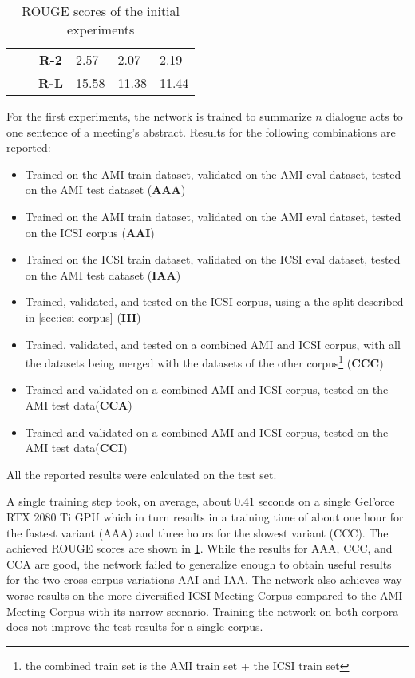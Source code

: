 \begin{table}[h]
\begin{tabular}{c|l|clll}
                              &                                                                                            & \textbf{R-2}    & 2.57         & 2.07         & 2.19       \\
                              &                                                                                            & \textbf{R-L}    & 15.58         & 11.38         & 11.44       \\ \hline
\end{tabular}
\caption{ROUGE scores of the initial experiments}
\label{tab:initial-experiment-rouge}
\end{table}

For the first experiments, the network is trained to summarize $n$ dialogue acts to one sentence of a meeting's abstract.
Results for the following combinations are reported:

\begin{itemize}
\item Trained on the AMI train dataset, validated on the AMI eval dataset, tested on the AMI test dataset (\textbf{AAA})
\item Trained on the AMI train dataset, validated on the AMI eval dataset, tested on the ICSI corpus (\textbf{AAI})
\item Trained on the ICSI train dataset, validated on the ICSI eval dataset, tested on the AMI test dataset (\textbf{IAA})
\item Trained, validated, and tested on the ICSI corpus, using a the split described in \cref{sec:icsi-corpus} (\textbf{III})
\item Trained, validated, and tested on a combined AMI and ICSI corpus, with all the datasets being merged with the datasets of the other corpus\footnote{\Eg the combined train set is the AMI train set + the ICSI train set} (\textbf{CCC})
\item Trained and validated on a combined AMI and ICSI corpus, tested on the AMI test data(\textbf{CCA})
\item Trained and validated on a combined AMI and ICSI corpus, tested on the AMI test data(\textbf{CCI})
\end{itemize}

All the reported results were calculated on the test set.

A single training step took, on average, about $0.41$ seconds on a single GeForce RTX 2080 Ti GPU which in turn results in a training time of about one hour for the fastest variant (AAA) and three hours for the slowest variant (CCC).
The achieved ROUGE scores are shown in \cref{tab:initial-experiment-rouge}.
While the results for AAA, CCC, and CCA are good, the network failed to generalize enough to obtain useful results for the two cross-corpus variations AAI and IAA.
The network also achieves way worse results on the more diversified ICSI Meeting Corpus compared to the AMI Meeting Corpus with its narrow scenario.
Training the network on both corpora does not improve the test results for a single corpus.


